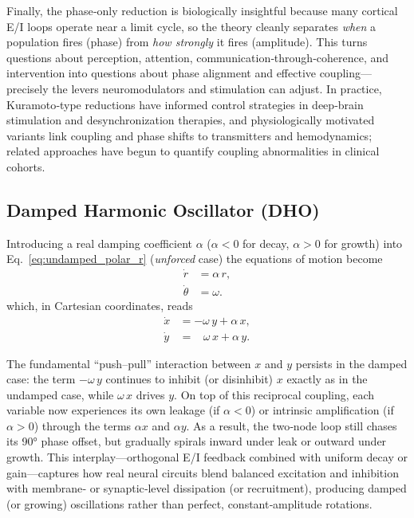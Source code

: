 \documentclass[11pt]{article}
\numberwithin{equation}{section}
\begin{document}
Finally, the phase‑only reduction is biologically insightful because many cortical E/I loops operate near a limit cycle, so the theory cleanly separates \emph{when} a population fires (phase) from \emph{how strongly} it fires (amplitude). This turns questions about perception, attention, communication‑through‑coherence\cite{fries_rhythms_2015}, and intervention into questions about phase alignment and effective coupling—precisely the levers neuromodulators and stimulation can adjust. In practice, Kuramoto‑type reductions have informed control strategies in deep‑brain stimulation and desynchronization therapies\cite{Tass2003CR,Popovych2018Multisite,Weerasinghe2019DBS,Weerasinghe2021MultiContactDBS}, and physiologically motivated variants link coupling and phase shifts to transmitters and hemodynamics\cite{Sadilek2015MultiplexKuramoto}; related approaches have begun to quantify coupling abnormalities in clinical cohorts\cite{Bauer2022KuramotoMDD}.










\subsection{Damped Harmonic Oscillator (DHO)}
Introducing a real damping coefficient \( \alpha \) (\( \alpha<0 \) for decay, \( \alpha>0 \) for growth) into Eq.~\eqref{eq:undamped_polar_r} 
(\emph{unforced} case) the equations of motion become
\begin{align}
    \dot{r}      &= \alpha\,r,  \label{eq:damped_polar_r}\\
    \dot{\theta} &= \omega.     \label{eq:damped_polar_theta}
\end{align}
\noindent
which, in Cartesian coordinates, reads
\begin{align}
    \dot{x} &= -\omega\,y + \alpha\,x, \label{eq:damped_cart_x}\\
    \dot{y} &=  \;\;\;\omega\,x + \alpha\,y. \label{eq:damped_cart_y}
\end{align}



The fundamental “push–pull” interaction between \(x\) and \(y\) persists in the damped case: the term \(-\omega\,y\) continues to inhibit (or disinhibit) \(x\) exactly as in the undamped case, while \(\omega\,x\) drives \(y\).  On top of this reciprocal coupling, each variable now experiences its own leakage (if \(\alpha <0\)) or intrinsic amplification (if \(\alpha>0\)) through the terms \(\alpha x\) and \(\alpha y\). As a result, the two‐node loop still chases its 90° phase offset, but gradually spirals inward under leak or outward under growth.  This interplay—orthogonal E/I feedback combined with uniform decay or gain—captures how real neural circuits blend balanced excitation and inhibition with membrane‐ or synaptic‐level dissipation (or recruitment), producing damped (or growing) oscillations rather than perfect, constant‐amplitude rotations.  
\end{document}
